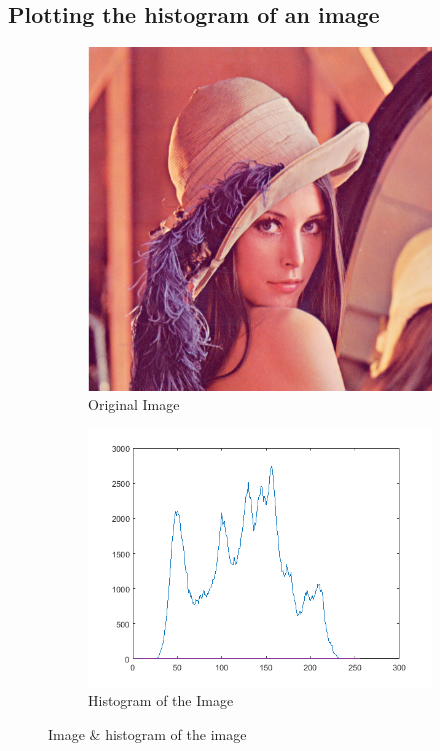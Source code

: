\documentclass[a4paper,16pt]{article}
\begin{document}
	\subsection{Plotting the histogram of an image}
	\vspace{0.2in}
		
		\vspace{0.4in}
		\begin{figure}[h!]
			\begin{subfigure}[h]{0.4\linewidth}
				\includegraphics[width=\linewidth]{original}
				\caption{Original Image}
			\end{subfigure}
			\hfill
			\begin{subfigure}[h]{0.52\linewidth}
				\includegraphics[width=\linewidth]{histogram}
				\caption{Histogram of the Image}
			\end{subfigure}%
			\caption{Image \& histogram of the image}
		\end{figure}
	\newpage
\end{document}
